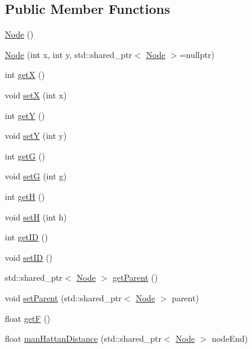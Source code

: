 \subsection*{Public Member Functions}
\begin{DoxyCompactItemize}
\item 
\hyperlink{class_node_ad7a34779cad45d997bfd6d3d8043c75f}{Node} ()
\item 
\hyperlink{class_node_ad00949d1efbe6d24086446c2b16e8876}{Node} (int x, int y, std\+::shared\+\_\+ptr$<$ \hyperlink{class_node}{Node} $>$=nullptr)
\item 
int \hyperlink{class_node_a6c026e5d8c28591c6e2bd08c68619fd1}{getX} ()
\item 
void \hyperlink{class_node_adb106b3c9cca356ce404d45ce9ef1a89}{setX} (int x)
\item 
int \hyperlink{class_node_abab48a3f494994d4f456897f3372d3ae}{getY} ()
\item 
void \hyperlink{class_node_a2655bd886609cf39f486130733124ec7}{setY} (int y)
\item 
int \hyperlink{class_node_a9133c5c2e1c994b914535bbbefa33d7c}{getG} ()
\item 
void \hyperlink{class_node_acc878bf405f93ff15be94426b0f768f4}{setG} (int g)
\item 
int \hyperlink{class_node_a1108111505a673b217d5e13d6ac36d14}{getH} ()
\item 
void \hyperlink{class_node_a6076b0a2e7543341bd7b6e60c7635157}{setH} (int h)
\item 
int \hyperlink{class_node_a8dd9a1d6ac9638fd1168283ad47e5127}{get\+ID} ()
\item 
void \hyperlink{class_node_ae2ecbbfa7ede81db532c484e7e134fe6}{set\+ID} ()
\item 
std\+::shared\+\_\+ptr$<$ \hyperlink{class_node}{Node} $>$ \hyperlink{class_node_a5a7ffc7ca51647866a2d458cc8b42e00}{get\+Parent} ()
\item 
void \hyperlink{class_node_a5889e5c01190f75a7074e00c76f6a68a}{set\+Parent} (std\+::shared\+\_\+ptr$<$ \hyperlink{class_node}{Node} $>$ parent)
\item 
float \hyperlink{class_node_af483f2ed468aad829701a0ca7ba68966}{getF} ()
\item 
float \hyperlink{class_node_a2454f74ba33e81bd20945139c73e28fa}{man\+Hattan\+Distance} (std\+::shared\+\_\+ptr$<$ \hyperlink{class_node}{Node} $>$ node\+End)
\end{DoxyCompactItemize}
